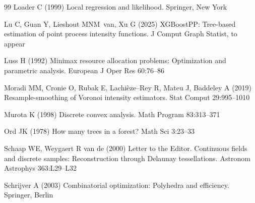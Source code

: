 \documentclass[twoside,11pt]{article}
\begin{document}
\begin{thebibliography}{99}
Loader C (1999)
Local regression and likelihood.
Springer, New York

Lu C, Guan Y, Lieshout MNM~van, Xu G (2025)
XGBoostPP: Tree-based estimation of point process intensity functions.
J Comput Graph Statist, to appear

Luss H (1992)
Minimax resource allocation problems: Optimization and parametric
analysis. 
European J Oper Res 60:76--86

Moradi MM, Cronie O, Rubak E, Lachi\`eze--Rey R, Mateu J, 
Baddeley A (2019)
Resample-smoothing of Voronoi intensity estimators. 
Stat Comput 29:995–1010

Murota K (1998)
Discrete convex analysis.
Math Program 83:313--371

Ord JK (1978)
How many trees in a forest?
Math Sci 3:23--33

Schaap WE, Weygaert R van de (2000)
Letter to the Editor. Continuous fields and discrete samples:
Reconstruction through Delaunay tessellations.
Astronom Astrophys 363:L29--L32

Schrijver A (2003)
Combinatorial optimization: Polyhedra and efficiency.
Springer, Berlin
  
\end{thebibliography}
\end{document}
